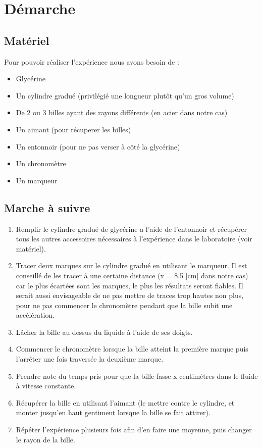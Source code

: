 \section{Démarche}\label{sec:demarche}

\subsection{Matériel}\label{subsec:materiel}
Pour pouvoir réaliser l’expérience nous avons besoin de :
\begin{itemize}
    \item Glycérine
    \item Un cylindre gradué (privilégié une longueur plutôt qu'un gros volume)
    \item De 2 ou 3 billes ayant des rayons différents (en acier dans notre cas)
    \item Un aimant (pour récuperer les billes)
    \item Un entonnoir (pour ne pas verser à côté la glycérine)
    \item Un chronomètre
    \item Un marqueur
\end{itemize}

\subsection{Marche à suivre}\label{subsec:marche-a-suivre}
\begin{enumerate}
    \item Remplir le cylindre gradué de glycérine a l’aide de l’entonnoir et récupérer tous les autres accessoires nécessaires à l’expérience dans le laboratoire (voir matériel).
    \item Tracer deux marques sur le cylindre gradué en utilisant le marqueur.
    Il est conseillé de les tracer à une certaine distance (x = 8.5 [cm] dans notre cas) car le plus écartées sont les marques, le plus les résultats seront fiables.
    Il serait aussi envisageable de ne pas mettre de traces trop hautes non plus, pour ne pas commencer le chronomètre pendant que la bille subit une accélération.
    \item Lâcher la bille au dessus du liquide à l’aide de ses doigts.
    \item Commencer le chronomètre lorsque la bille atteint la première marque puis l’arrêter une fois traversée la deuxième marque.
    \item Prendre note du temps pris pour que la bille fasse x centimètres dans le fluide à vitesse constante.
    \item Récupérer la bille en utilisant l’aimant (le mettre contre le cylindre, et monter jusqu’en haut gentiment lorsque la bille se fait attirer).
    \item Répéter l’expérience plusieurs fois afin d’en faire une moyenne, puis changer le rayon de la bille.
\end{enumerate}

